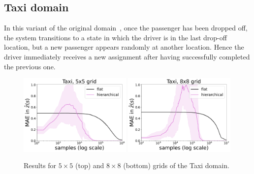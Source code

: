  \subsection{Taxi domain}
  In this variant of the original domain~\citep{Dietterich2000}, once the passenger has been dropped off, the system transitions to a state in which the driver is in the last drop-off location, but a new passenger appears randomly at another location. Hence the driver immediately receives a new assignment after having successfully completed the previous one.
  \begin{figure}[!hb]
    \begin{center}
        \includegraphics*[width=0.49\textwidth]{figures/chapter2/online/taxi_5.pdf}
        \includegraphics*[width=0.49\textwidth]{figures/chapter2/online/taxi_8.pdf}
        \caption{Results for $5 \times 5$ (top) and $8 \times 8$ (bottom) grids of the Taxi domain.}
          \label{fig:halmdps_taxi}
    \end{center}
  \end{figure}

